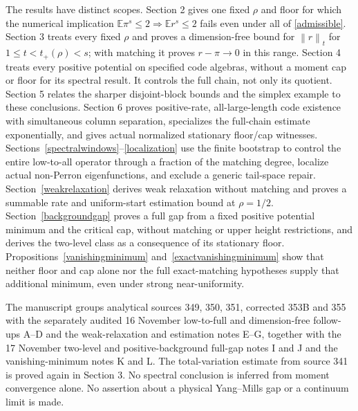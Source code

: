 \documentclass[11pt]{article}
\newcommand{\E}{\mathbb E}
\newcommand{\norm}[1]{\left\|#1\right\|}
\begin{document}
The results have distinct scopes. Section 2 gives one fixed $\rho$ and floor for which the numerical implication $\E\pi^s\leq2\Rightarrow\E r^s\leq2$ fails even under all of \eqref{admissible}. Section 3 treats every fixed $\rho$ and proves a dimension-free bound for $\norm r_t$ for $1\leq t<t_+(\rho)<s$; with matching it proves $r-\pi\to0$ in this range. Section 4 treats every positive potential on specified code algebras, without a moment cap or floor for its spectral result. It controls the full chain, not only its quotient. Section 5 relates the sharper disjoint-block bounds and the simplex example to these conclusions. Section 6 proves positive-rate, all-large-length code existence with simultaneous column separation, specializes the full-chain estimate exponentially, and gives actual normalized stationary floor/cap witnesses. Sections~\ref{spectralwindows}--\ref{localization} use the finite bootstrap to control the entire low-to-all operator through a fraction of the matching degree, localize actual non-Perron eigenfunctions, and exclude a generic tail-space repair. Section~\ref{weakrelaxation} derives weak relaxation without matching and proves a summable rate and uniform-start estimation bound at $\rho=1/2$. Section~\ref{backgroundgap} proves a full gap from a fixed positive potential minimum and the critical cap, without matching or upper height restrictions, and derives the two-level class as a consequence of its stationary floor. Propositions~\ref{vanishingminimum} and~\ref{exactvanishingminimum} show that neither floor and cap alone nor the full exact-matching hypotheses supply that additional minimum, even under strong near-uniformity.

The manuscript groups analytical sources 349, 350, 351, corrected 353B and 355 with the separately audited 16 November low-to-full and dimension-free follow-ups A--D and the weak-relaxation and estimation notes E--G, together with the 17 November two-level and positive-background full-gap notes I and J and the vanishing-minimum notes K and L. The total-variation estimate from source 341 is proved again in Section 3. No spectral conclusion is inferred from moment convergence alone. No assertion about a physical Yang--Mills gap or a continuum limit is made.
\end{document}
